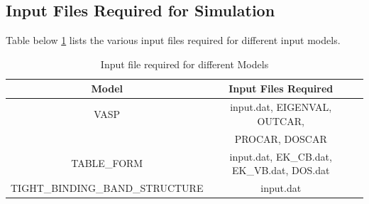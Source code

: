 \documentclass[12pt]{article}
\begin{document}
    \subsection{Input Files Required for Simulation}  
    Table below \ref{input_files_table} lists the various input files required for different input models.
    
\begin{table} [H]
\caption{ Input file required for different Models}
\label{input_files_table}
\begin{tabular}{|c|c|c|}
\hline
Model & Input Files Required   \\
\hline                                      
VASP   & input.dat, EIGENVAL, OUTCAR, \\
& PROCAR, DOSCAR \\
\hline   
TABLE\_FORM & input.dat, EK\_CB.dat, EK\_VB.dat, DOS.dat    \\
\hline  
TIGHT\_BINDING\_BAND\_STRUCTURE   & input.dat     \\
\hline
\end{tabular}
\end{table}

\end{document}

